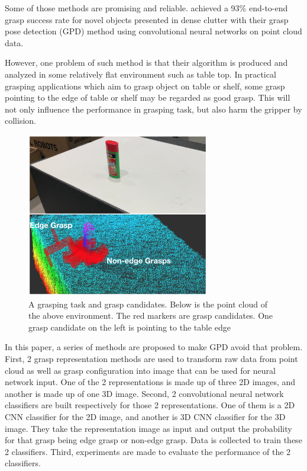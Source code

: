 \documentclass[letterpaper]{article} %
\begin{document}
Some of those methods are promising and reliable. \cite{RN6} achieved a 93\% end-to-end grasp success rate for novel objects presented in dense clutter with their grasp pose detection (GPD) method using convolutional neural networks on point cloud data. 

However, one problem of such method is that their algorithm is produced and analyzed in some relatively flat environment such as table top. In practical grasping applications which aim to grasp object on table or shelf, some grasp pointing to the edge of table or shelf may be regarded as good grasp. This will not only influence the performance in grasping task, but also harm the gripper by collision. 

\begin{figure}[t]
    \centering
    \includegraphics[width=8cm]{images/edgegraspexample.png}
    \caption{A grasping task and grasp candidates. Below is the point cloud of the above environment. The red markers are grasp candidates. One grasp candidate on the left is pointing to the table edge}
    \label{fig:my_label}
\end{figure}

In this paper, a series of methods are proposed to make GPD avoid that problem. First, 2 grasp representation methods are used to transform raw data from point cloud as well as grasp configuration into image that can be used for neural network input. One of the 2 representations is made up of three 2D images, and another is made up of one 3D image. Second, 2 convolutional neural network classifiers are built respectively for those 2 representations. One of them is a 2D CNN classifier for the 2D image, and another is 3D CNN classifier for the 3D image. They take the representation image as input and output the probability for that grasp being edge grasp or non-edge grasp. Data is collected to train these 2 classifiers. Third, experiments are made to evaluate the performance of the 2 classifiers.
\end{document}

